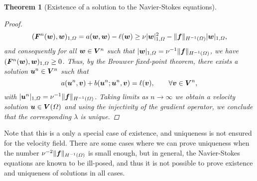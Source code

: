 \documentclass{article}
\renewcommand{\vec}{\vectorsym}
\newtheorem{theorem}{Theorem}
\begin{document}
\begin{theorem}[Existence of a solution to the Navier-Stokes equations]
\begin{proof}
        \begin{equation*}
            (\vec F^n(\vec w), \vec w)_{1,\Omega} = a(\vec w, \vec w) - \ell(\vec w) \geq \nu|\vec w|^2_{1,\Omega} - \|\vec f\|_{H^{-1}(\Omega)}|\vec w|_{1,\Omega},
        \end{equation*}
        and consequently for all $\vec w\in\vec V^n$ such that $|\vec w|_{1,\Omega} = \nu^{-1}\|\vec f\|_{H^{-1}(\Omega)}$, we have $(\vec F^n(\vec w), \vec w)_{1,\Omega} \geq 0$. Thus, by the Brouwer fixed-point theorem, there exists a solution $\vec u^n\in\vec V^n$ such that 
        \begin{equation*}
            a(\vec u^n, \vec v) + b(\vec u^n; \vec u^n, \vec v)  = \ell(\vec v), \qquad \forall \vec v\in\vec V^n,
        \end{equation*}
        with $|\vec u^n|_{1,\Omega} = \nu^{-1}\|\vec f\|_{H^{-1}(\Omega)}$. Taking limits as $n\to\infty$ we obtain a velocity solution $\vec u\in\vec V(\Omega)$ and using the injectivity of the gradient operator, we conclude that the corresponding $\lambda$ is unique. 
    \end{proof}
\end{theorem}
Note that this is a only a special case of existence, and uniqueness is not ensured for the velocity field. There are some cases where we can prove uniqueness when the number $\nu^{-2}\|\vec f\|_{H^{-1}(\Omega)}$ is small enough, but in general, the Navier-Stokes equations are known to be ill-posed, and thus it is not possible to prove existence and uniqueness of solutions in all cases.


\end{document}
